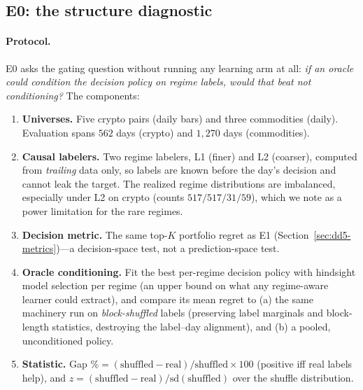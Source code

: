 \subsection{E0: the structure diagnostic}
\label{sec:dd5-e0}

\paragraph{Protocol.} E0 asks the gating question without running any
learning arm at all: \emph{if an oracle could condition the decision policy
on regime labels, would that beat not conditioning?} The components:

\begin{enumerate}
\item \textbf{Universes.} Five crypto pairs (daily bars) and three
commodities (daily). Evaluation spans $562$ days (crypto) and $1{,}270$
days (commodities).
\item \textbf{Causal labelers.} Two regime labelers, L1 (finer) and L2
(coarser), computed from \emph{trailing} data only, so labels are known
before the day's decision and cannot leak the target. The realized regime
distributions are imbalanced, especially under L2 on crypto
(counts $517/517/31/59$), which we note as a power limitation for the rare
regimes.
\item \textbf{Decision metric.} The same top-$K$ portfolio regret as E1
(Section~\ref{sec:dd5-metrics})---a decision-space test, not a
prediction-space test.
\item \textbf{Oracle conditioning.} Fit the best per-regime decision policy
with hindsight model selection per regime (an upper bound on what any
regime-aware learner could extract), and compare its mean regret to
(a) the same machinery run on \emph{block-shuffled} labels (preserving label
marginals and block-length statistics, destroying the label--day
alignment), and (b) a pooled, unconditioned policy.
\item \textbf{Statistic.} Gap $\% = (\text{shuffled} - \text{real}) /
\text{shuffled} \times 100$ (positive iff real labels help), and
$z = (\text{shuffled} - \text{real}) / \mathrm{sd}(\text{shuffled})$ over
the shuffle distribution.
\end{enumerate}

